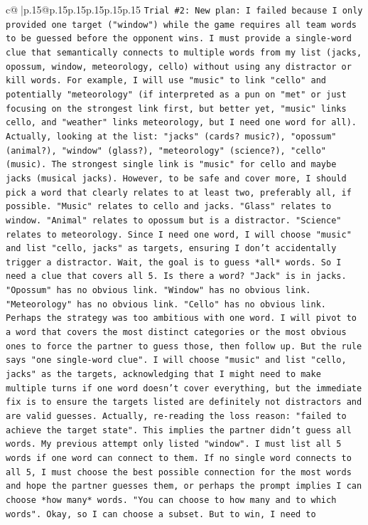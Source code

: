\documentclass{article}
\begin{document}
{\begin{supertabular}{c@{$\;$}|p{.15\linewidth}@{}p{.15\linewidth}p{.15\linewidth}p{.15\linewidth}p{.15\linewidth}p{.15\linewidth}}
{{{\texttt{Trial \#2: New plan: I failed because I only provided one target ("window") while the game requires all team words to be guessed before the opponent wins. I must provide a single{-}word clue that semantically connects to multiple words from my list (jacks, opossum, window, meteorology, cello) without using any distractor or kill words. For example, I will use "music" to link "cello" and potentially "meteorology" (if interpreted as a pun on "met" or just focusing on the strongest link first, but better yet, "music" links cello, and "weather" links meteorology, but I need one word for all). Actually, looking at the list: "jacks" (cards? music?), "opossum" (animal?), "window" (glass?), "meteorology" (science?), "cello" (music). The strongest single link is "music" for cello and maybe jacks (musical jacks). However, to be safe and cover more, I should pick a word that clearly relates to at least two, preferably all, if possible. "Music" relates to cello and jacks. "Glass" relates to window. "Animal" relates to opossum but is a distractor. "Science" relates to meteorology. Since I need one word, I will choose "music" and list "cello, jacks" as targets, ensuring I don't accidentally trigger a distractor. Wait, the goal is to guess *all* words. So I need a clue that covers all 5. Is there a word? "Jack" is in jacks. "Opossum" has no obvious link. "Window" has no obvious link. "Meteorology" has no obvious link. "Cello" has no obvious link. Perhaps the strategy was too ambitious with one word. I will pivot to a word that covers the most distinct categories or the most obvious ones to force the partner to guess those, then follow up. But the rule says "one single{-}word clue". I will choose "music" and list "cello, jacks" as the targets, acknowledging that I might need to make multiple turns if one word doesn't cover everything, but the immediate fix is to ensure the targets listed are definitely not distractors and are valid guesses. Actually, re{-}reading the loss reason: "failed to achieve the target state". This implies the partner didn't guess all words. My previous attempt only listed "window". I must list all 5 words if one word can connect to them. If no single word connects to all 5, I must choose the best possible connection for the most words and hope the partner guesses them, or perhaps the prompt implies I can choose *how many* words. "You can choose to how many and to which words". Okay, so I can choose a subset. But to win, I need to} \\
\\ 
}}}
\end{supertabular}}
\end{document}
